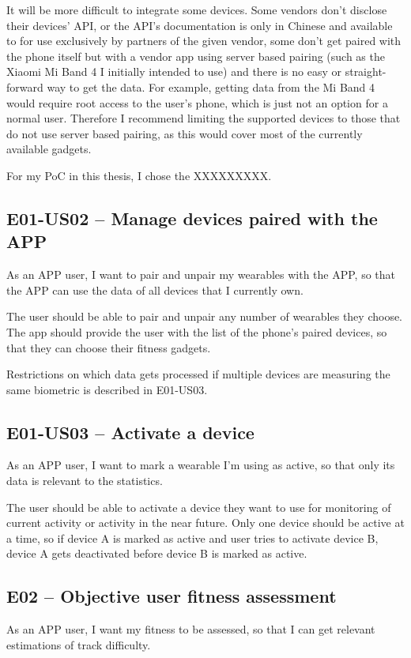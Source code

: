 It will be more difficult to integrate some devices.
Some vendors don't disclose their devices' API, or the API's documentation is only in Chinese and available to for use exclusively by partners of the given vendor,
some don't get paired with the phone itself but with a vendor app using server based pairing (such as the Xiaomi Mi Band 4 I initially intended to use) and there is no easy or straight-forward way to get the data.
For example, getting data from the Mi Band 4 would require root access to the user's phone\cite{miband4-server-based}, which is just not an option for a normal user.
Therefore I recommend limiting the supported devices to those that do not use server based pairing, as this would cover most of the currently available gadgets.

For my PoC in this thesis, I chose the XXXXXXXXX.

\subsection*{E01-US02 -- Manage devices paired with the APP}
As an APP user, I want to pair and unpair my wearables with the APP, so that the APP can use the data of all devices that I currently own.

The user should be able to pair and unpair any number of wearables they choose.
The app should provide the user with the list of the phone's paired devices, so that they can choose their fitness gadgets.

Restrictions on which data gets processed if multiple devices are measuring the same biometric is described in E01-US03.

\subsection*{E01-US03 -- Activate a device}
As an APP user, I want to mark a wearable I'm using as active, so that only its data is relevant to the statistics.

The user should be able to activate a device they want to use for monitoring of current activity or activity in the near future.
Only one device should be active at a time, so if device A is marked as active and user tries to activate device B, device A gets deactivated before device B is marked as active.

\subsection*{E02 -- Objective user fitness assessment}
As an APP user, I want my fitness to be assessed, so that I can get relevant estimations of track difficulty.

